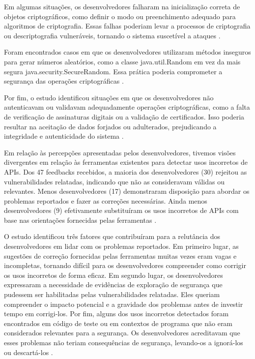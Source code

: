 Em algumas situações, os desenvolvedores falharam na inicialização correta de objetos criptográficos, como definir o modo ou preenchimento adequado para algoritmos de criptografia. Essas falhas poderiam levar a processos de criptografia ou descriptografia vulneráveis, tornando o sistema suscetível a ataques \cite{api_misuses_zhang}.

Foram encontrados casos em que os desenvolvedores utilizaram métodos inseguros para gerar números aleatórios, como a classe java.util.Random em vez da mais segura java.security.SecureRandom. Essa prática poderia comprometer a segurança das operações criptográficas \cite{api_misuses_zhang}.

Por fim, o estudo identificou situações em que os desenvolvedores não autenticavam ou validavam adequadamente operações criptográficas, como a falta de verificação de assinaturas digitais ou a validação de certificados. Isso poderia resultar na aceitação de dados forjados ou adulterados, prejudicando a integridade e autenticidade do sistema \cite{api_misuses_zhang}.



Em relação às percepções apresentadas pelos desenvolvedores, tivemos visões divergentes em relação às ferramentas existentes para detectar usos incorretos de APIs. Dos 47 feedbacks recebidos, a maioria dos desenvolvedores (30) rejeitou as vulnerabilidades relatadas, indicando que não as consideravam válidas ou relevantes. Menos desenvolvedores (17) demonstraram disposição para abordar os problemas reportados e fazer as correções necessárias. Ainda menos desenvolvedores (9) efetivamente substituíram os usos incorretos de APIs com base nas orientações fornecidas pelas ferramentas \cite{api_misuses_zhang}.

O estudo identificou três fatores que contribuíram para a relutância dos desenvolvedores em lidar com os problemas reportados. Em primeiro lugar, as sugestões de correção fornecidas pelas ferramentas muitas vezes eram vagas e incompletas, tornando difícil para os desenvolvedores compreender como corrigir os usos incorretos de forma eficaz. Em segundo lugar, os desenvolvedores expressaram a necessidade de evidências de exploração de segurança que pudessem ser habilitadas pelas vulnerabilidades relatadas. Eles queriam compreender o impacto potencial e a gravidade dos problemas antes de investir tempo em corrigi-los. Por fim, alguns dos usos incorretos detectados foram encontrados em código de teste ou em contextos de programa que não eram considerados relevantes para a segurança. Os desenvolvedores acreditavam que esses problemas não teriam consequências de segurança, levando-os a ignorá-los ou descartá-los \cite{api_misuses_zhang}.

